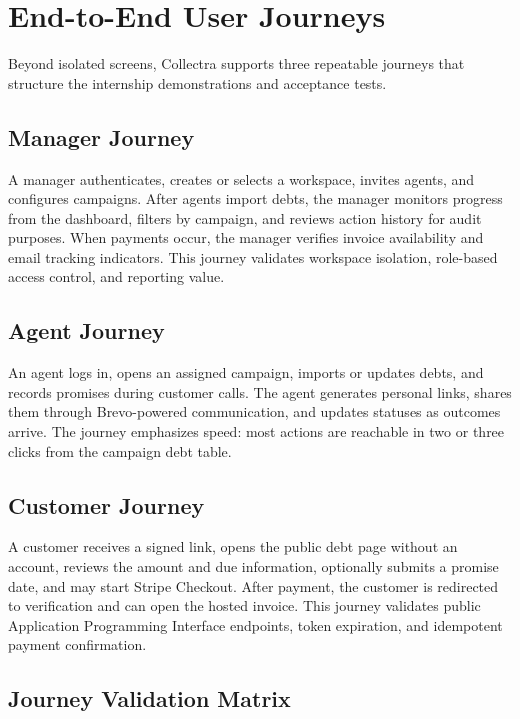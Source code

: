 \documentclass[12pt,a4paper]{report}
\begin{document}
\section{End-to-End User Journeys}
\label{sec:user-journeys}

Beyond isolated screens, Collectra supports three repeatable journeys that structure the
internship demonstrations and acceptance tests.

\subsection{Manager Journey}

A manager authenticates, creates or selects a workspace, invites agents, and configures campaigns.
After agents import debts, the manager monitors progress from the dashboard, filters by campaign,
and reviews action history for audit purposes.
When payments occur, the manager verifies invoice availability and email tracking indicators.
This journey validates workspace isolation, role-based access control, and reporting value.

\subsection{Agent Journey}

An agent logs in, opens an assigned campaign, imports or updates debts, and records promises
during customer calls.
The agent generates personal links, shares them through Brevo-powered communication, and updates
statuses as outcomes arrive.
The journey emphasizes speed: most actions are reachable in two or three clicks from the campaign
debt table.

\subsection{Customer Journey}

A customer receives a signed link, opens the public debt page without an account, reviews the
amount and due information, optionally submits a promise date, and may start Stripe Checkout.
After payment, the customer is redirected to verification and can open the hosted invoice.
This journey validates public Application Programming Interface endpoints, token expiration, and
idempotent payment confirmation.

\subsection{Journey Validation Matrix}
\end{document}
